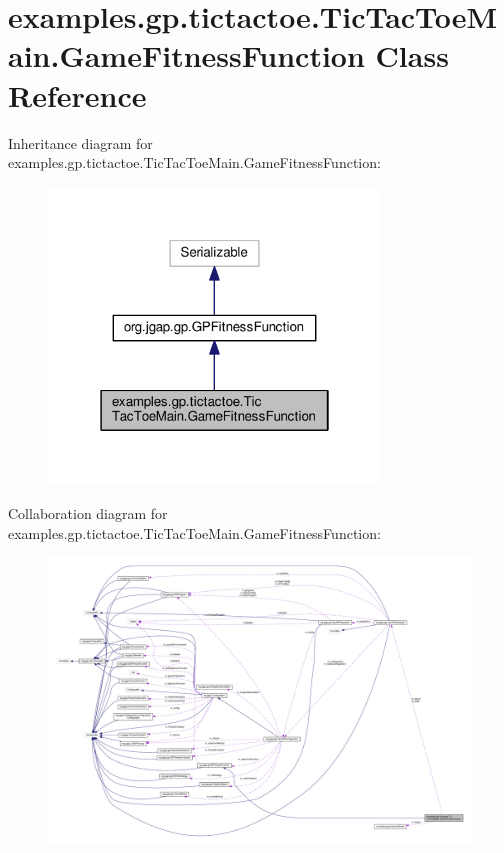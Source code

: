 \hypertarget{classexamples_1_1gp_1_1tictactoe_1_1_tic_tac_toe_main_1_1_game_fitness_function}{\section{examples.\-gp.\-tictactoe.\-Tic\-Tac\-Toe\-Main.\-Game\-Fitness\-Function Class Reference}
\label{classexamples_1_1gp_1_1tictactoe_1_1_tic_tac_toe_main_1_1_game_fitness_function}
}


Inheritance diagram for examples.\-gp.\-tictactoe.\-Tic\-Tac\-Toe\-Main.\-Game\-Fitness\-Function\-:
\nopagebreak
\begin{figure}[H]
\begin{center}
\leavevmode
\includegraphics[width=250pt]{classexamples_1_1gp_1_1tictactoe_1_1_tic_tac_toe_main_1_1_game_fitness_function__inherit__graph}
\end{center}
\end{figure}


Collaboration diagram for examples.\-gp.\-tictactoe.\-Tic\-Tac\-Toe\-Main.\-Game\-Fitness\-Function\-:
\nopagebreak
\begin{figure}[H]
\begin{center}
\leavevmode
\includegraphics[width=350pt]{classexamples_1_1gp_1_1tictactoe_1_1_tic_tac_toe_main_1_1_game_fitness_function__coll__graph}
\end{center}
\end{figure}
